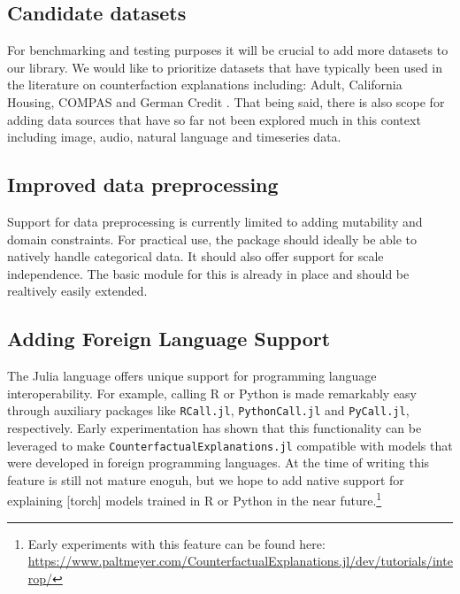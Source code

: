 \documentclass[
  letterpaper,
  DIV=11,
  numbers=noendperiod]{scrartcl}
\begin{document}
\hypertarget{candidate-datasets}{%
\subsection{Candidate datasets}\label{candidate-datasets}}

For benchmarking and testing purposes it will be crucial to add more
datasets to our library. We would like to prioritize datasets that have
typically been used in the literature on counterfaction explanations
including: Adult, California Housing, COMPAS and German Credit
\cite{karimi2020survey}. That being said, there is also scope for adding
data sources that have so far not been explored much in this context
including image, audio, natural language and timeseries data.

\hypertarget{improved-data-preprocessing}{%
\subsection{Improved data
preprocessing}\label{improved-data-preprocessing}}

Support for data preprocessing is currently limited to adding mutability
and domain constraints. For practical use, the package should ideally be
able to natively handle categorical data. It should also offer support
for scale independence. The basic module for this is already in place
and should be realtively easily extended.

\hypertarget{sec-dis-foreign}{%
\subsection{Adding Foreign Language Support}\label{sec-dis-foreign}}

The Julia language offers unique support for programming language
interoperability. For example, calling R or Python is made remarkably
easy through auxiliary packages like \texttt{RCall.jl},
\texttt{PythonCall.jl} and \texttt{PyCall.jl}, respectively. Early
experimentation has shown that this functionality can be leveraged to
make \texttt{CounterfactualExplanations.jl} compatible with models that
were developed in foreign programming languages. At the time of writing
this feature is still not mature enoguh, but we hope to add native
support for explaining {[}torch{]} models trained in R or Python in the
near future.\footnote{Early experiments with this feature can be found
  here:
  \url{https://www.paltmeyer.com/CounterfactualExplanations.jl/dev/tutorials/interop/}}
\end{document}
